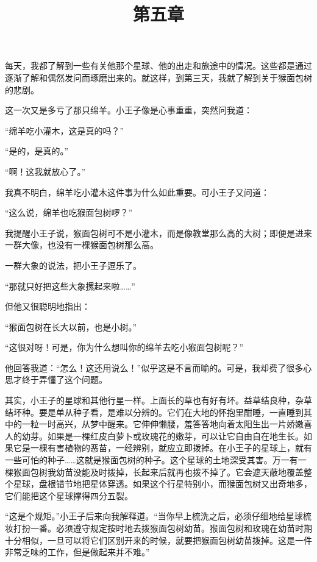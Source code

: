 \title{第五章}

每天，我都了解到一些有关他那个星球、他的出走和旅途中的情况。这些都是通过逐渐了解和偶然发问而琢磨出来的。就这样，到第三天，我就了解到关于猴面包树的悲剧。

这一次又是多亏了那只绵羊。小王子像是心事重重，突然问我道：

“绵羊吃小灌木，这是真的吗？”

“是的，是真的。”

“啊！这我就放心了。”

我真不明白，绵羊吃小灌木这件事为什么如此重要。可小王子又问道：

“这么说，绵羊也吃猴面包树啰？”

我提醒小王子说，猴面包树可不是小灌木，而是像教堂那么高的大树；即便是进来一群大像，也没有一棵猴面包树那么高。

{\startalignment[center]
 \stopalignment}

一群大象的说法，把小王子逗乐了。

“那就只好把这些大象摞起来啦\ldots{}\ldots{}”

但他又很聪明地指出：

“猴面包树在长大以前，也是小树。”

“这很对呀！可是，你为什么想叫你的绵羊去吃小猴面包树呢？”

他回答我道：“怎么！这还用说么！”似乎这是不言而喻的。可是，我却费了很多心思才终于弄懂了这个问题。

其实，小王子的星球和其他行星一样。上面长的草也有好有坏。益草结良种，杂草结坏种。要是单从种子看，是难以分辨的。它们在大地的怀抱里酣睡，一直睡到其中的一粒一时高兴，从梦中醒来。它伸伸懒腰，羞答答地向着太阳生出一片娇嫩喜人的幼芽。如果是一棵红皮白萝卜或玫瑰花的嫩芽，可以让它自由自在地生长。如果它是一棵有害植物的恶苗，一经辨别，就应立即拨掉。在小王子的星球上，就有一些可怕的种子\ldots{}\ldots{}这就是猴面包树的种子。这个星球的土地深受其害。万一有一棵猴面包树我幼苗没能及时拨掉，长起来后就再也拨不掉了。它会遮天蔽地覆盖整个星球，盘根错节地把星体穿透。如果这个行星特别小，而猴面包树又出奇地多，它们能把这个星球撑得四分五裂。

“这是个规矩。”小王子后来向我解释道。“当你早上梳洗之后，必须仔细地给星球梳妆打扮一番。必须遵守规定按时地去拨猴面包树幼苗。猴面包树和玫瑰在幼苗时期十分相似，一旦可以将它们区别开来的时候，就要把猴面包树幼苗拨掉。这是一件非常乏味的工作，但是做起来并不难。”

{\startalignment[center]
 \stopalignment}

